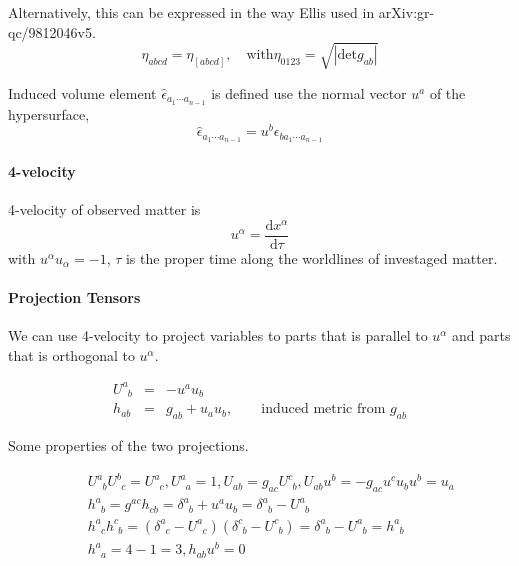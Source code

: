 Alternatively, this can be expressed in the way Ellis used in arXiv:gr-qc/9812046v5.
\begin{equation}
\eta_{abcd} = \eta_{[abcd]}, \quad \text{with} \eta_{0123} = \sqrt{|\mathrm {det} g_{ab}|}
\end{equation}

Induced volume element $\hat \epsilon_{a_1\cdots a_{n-1}}$ is defined use the normal vector $u^a$ of the hypersurface,
\begin{equation}
\hat \epsilon_{a_1\cdots a_{n-1}} = u^b \epsilon_{b a_1 \cdots a_{n-1}}
\end{equation}





\paragraph{4-velocity}
4-velocity of observed matter is 
\[u^\alpha = \frac{\mathrm d x^\alpha}{\mathrm d \tau}\]
with $u^\alpha u_\alpha =-1$, $\tau$ is the proper time along the worldlines of investaged matter.

\paragraph{Projection Tensors}

We can use 4-velocity to project variables to parts that is parallel to $u^\alpha$ and parts that is orthogonal to $u^\alpha$.

\begin{eqnarray}
U^a_{\phantom a b} &=& -u^a u_b \\
h_{ab} &=& g_{ab} + u_a u_b, \qquad \text{induced metric from $g_{ab}$}
\end{eqnarray}

Some properties of the  two projections.

\begin{eqnarray}
&& U^a_{\phantom a b} U^b_{\phantom bc} = U^a_{\phantom a c}  ,  U^a_{\phantom a a} = 1  , U_{ab}=g_{ac} U^c_{\phantom cb}  , U_{ab} u^b = - g_{ac} u^c u_b u^b = u_a \\
&& h^a_{\phantom ab} = g^{ac} h_{cb} = \delta^a_{\phantom ab} + u^a u_b = \delta^a_{\phantom ab} - U^a_{\phantom ab} \\
&& h^a_{\phantom a c}h^c_{\phantom c b} = (\delta^a_{\phantom ac} - U^a_{\phantom ac})(\delta^c_{\phantom cb} - U^c_{\phantom cb}) = \delta^a_{\phantom ab} - U^a_{\phantom ab} = h^a_{\phantom ab} \\
&& h^a_{\phantom aa} = 4-1 = 3  ,   h_{ab}u^b = 0
\end{eqnarray}





